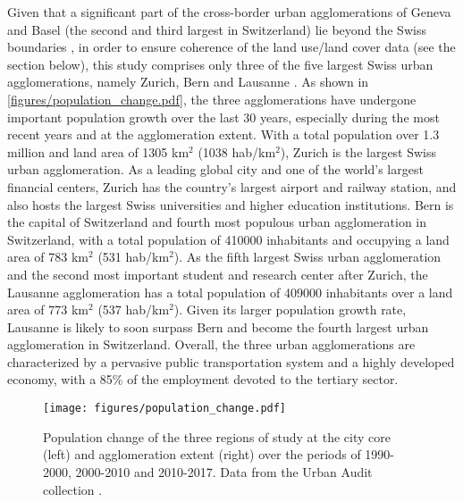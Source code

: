 Given that a significant part of the cross-border urban agglomerations of Geneva and Basel (the second and third largest in Switzerland) lie beyond the Swiss boundaries , in order to ensure coherence of the land use/land cover data (see the section below), this study comprises only three of the five largest Swiss urban agglomerations, namely Zurich, Bern and Lausanne .
As shown in \autoref{figures/population_change.pdf}, the three agglomerations have undergone important population growth over the last 30 years, especially during the most recent years and at the agglomeration extent.
With a total population over 1.3 million and land area of 1305 km$^2$ (1038 hab/km$^2$), Zurich is the largest Swiss urban agglomeration. As a leading global city and one of the world's largest financial centers, Zurich has the country's largest airport and railway station, and also hosts the largest Swiss universities and higher education institutions. 
Bern is the capital of Switzerland and fourth most populous urban agglomeration in Switzerland, with a total population of 410000 inhabitants and occupying a land area of 783 km$^2$ (531 hab/km$^2$). As the fifth largest Swiss urban agglomeration and the second most important student and research center after Zurich, the Lausanne agglomeration has a total population of 409000 inhabitants over a land area of 773 km$^2$ (537 hab/km$^2$). Given its larger population growth rate, Lausanne is likely to soon surpass Bern and become the fourth largest urban agglomeration in Switzerland.
Overall, the three urban agglomerations are characterized by a pervasive public transportation system and a highly developed economy, with a 85\% of the employment devoted to the tertiary sector.

\begin{figure}[!ht]
    \centering  
    \texttt{[image: figures/population\_change.pdf]}
    \vspace{.5em}
    \caption[Population change]{\label{figures/population_change.pdf}Population change of the three regions of study at the city core (left) and agglomeration extent (right) over the periods of 1990-2000, 2000-2010 and 2010-2017. Data from the Urban Audit collection .}
\end{figure}


